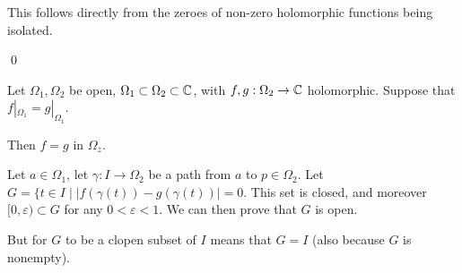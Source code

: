 \documentclass[x11names,reqno,14pt]{extarticle}
\begin{document}
This follows directly from the zeroes of non-zero holomorphic functions being isolated. 

\qed

\rem 

Let $\Omega_1, \Omega_2$ be open, $\Omega_1\subset\Omega_2\subset\mathbb{C}$, with $f, g:\Omega_2\to\mathbb{C}$ holomorphic. Suppose that $f|_{\Omega_1} = g|_{\Omega_1}$. 

Then $f = g$ in $\Omega_z$. 

\proof

Let $a \in \Omega_1$, let $\gamma:I\to\Omega_2$ be a path from $a$ to $p \in \Omega_2$. Let $G = \{t \in I \mid |f(\gamma(t)) - g(\gamma(t))| = 0$. This set is closed, and moreover $[0, \varepsilon) \subset G$ for any $0<\varepsilon<1$. We can then prove that $G$ is open. 

But for $G$ to be a clopen subset of $I$ means that $G = I$ (also because $G$ is nonempty). 
\end{document}
